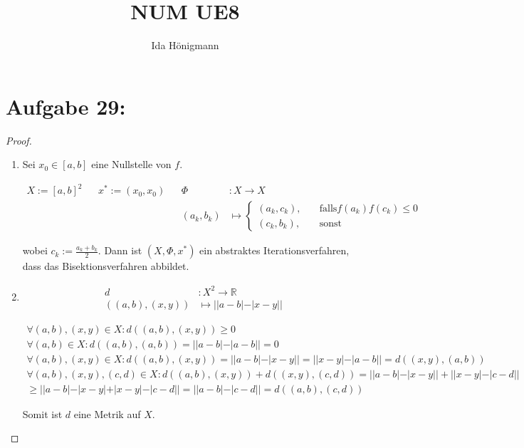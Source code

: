 \documentclass[]{article}
\title{NUM UE8}
\author{Ida Hönigmann}
\begin{document}
\maketitle

\section{Aufgabe 29:}

\begin{proof}
	\begin{enumerate}[label=\alph*)]
		\item 
		
		Sei $x_0 \in [a,b]$ eine Nullstelle von $f$.
		
		\begin{align*}
			X := [a,b]^2 && x^* := (x_0, x_0) && \Phi &: X \rightarrow X \\
			&& && (a_k, b_k) &\mapsto \begin{cases}
				(a_k, c_k), &\quad\text{falls} f(a_k)f(c_k)\le 0 \\
				(c_k, b_k), &\quad\text{sonst}
			\end{cases}
		\end{align*}
		
		wobei $c_k:=\frac{a_k+b_k}{2}$. Dann ist $(X, \Phi, x^*)$ ein abstraktes Iterationsverfahren, dass das Bisektionsverfahren abbildet.
		
		\item
		
		\begin{align*}
			d &:X^2\rightarrow\mathbb{R} \\
			((a,b),(x,y))&\mapsto ||a - b| - |x - y||
		\end{align*}
		
		\begin{align*}
			\forall (a,b), (x,y) \in X: d((a,b),(x,y))\geq 0\\
			\forall (a,b) \in X: d((a,b),(a,b)) = ||a - b| - |a - b|| = 0\\
			\forall (a,b), (x,y) \in X: d((a,b),(x,y)) = ||a - b| - |x - y|| = ||x - y| - |a - b|| = d((x,y),(a,b))\\
			\forall (a,b), (x,y), (c,d) \in X: d((a,b),(x,y)) + d((x,y), (c,d)) = ||a - b| - |x - y|| + ||x - y| - |c - d|| \\
			\geq ||a - b| - |x - y| + |x - y| - |c - d|| = ||a - b| - |c - d|| = d((a,b), (c,d))
		\end{align*}
		
		Somit ist $d$ eine Metrik auf $X$.
		

\end{enumerate}
\end{proof}
\end{document}
